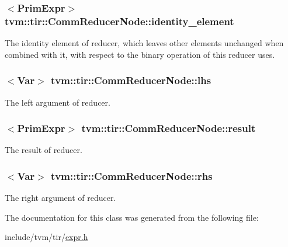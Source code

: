 \subsubsection[{\texorpdfstring{identity\+\_\+element}{identity_element}}]{$<${\bf Prim\+Expr}$>$ tvm\+::tir\+::\+Comm\+Reducer\+Node\+::identity\+\_\+element}\hypertarget{classtvm_1_1tir_1_1CommReducerNode_ad8cbb3f8e12db0a2a814c1cbde2e8b9c}{}\label{classtvm_1_1tir_1_1CommReducerNode_ad8cbb3f8e12db0a2a814c1cbde2e8b9c}


The identity element of reducer, which leaves other elements unchanged when combined with it, with respect to the binary operation of this reducer uses. 

\subsubsection[{\texorpdfstring{lhs}{lhs}}]{$<${\bf Var}$>$ tvm\+::tir\+::\+Comm\+Reducer\+Node\+::lhs}\hypertarget{classtvm_1_1tir_1_1CommReducerNode_a3fc76ed5cf3a73c803ce1c74dedf7429}{}\label{classtvm_1_1tir_1_1CommReducerNode_a3fc76ed5cf3a73c803ce1c74dedf7429}


The left argument of reducer. 

\subsubsection[{\texorpdfstring{result}{result}}]{$<${\bf Prim\+Expr}$>$ tvm\+::tir\+::\+Comm\+Reducer\+Node\+::result}\hypertarget{classtvm_1_1tir_1_1CommReducerNode_a7030917568a088215da423fc56882814}{}\label{classtvm_1_1tir_1_1CommReducerNode_a7030917568a088215da423fc56882814}


The result of reducer. 

\subsubsection[{\texorpdfstring{rhs}{rhs}}]{$<${\bf Var}$>$ tvm\+::tir\+::\+Comm\+Reducer\+Node\+::rhs}\hypertarget{classtvm_1_1tir_1_1CommReducerNode_a2902b0d55dd823febc6941fae9f32337}{}\label{classtvm_1_1tir_1_1CommReducerNode_a2902b0d55dd823febc6941fae9f32337}


The right argument of reducer. 



The documentation for this class was generated from the following file\+:\begin{DoxyCompactItemize}
\item 
include/tvm/tir/\hyperlink{tir_2expr_8h}{expr.\+h}\end{DoxyCompactItemize}
